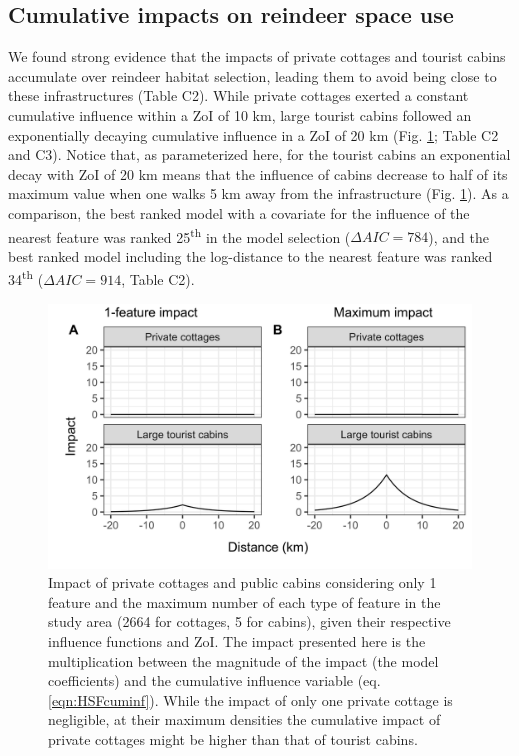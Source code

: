 \documentclass[titlepage]{article}
\begin{document}
\subsection{Cumulative impacts on reindeer space use}

We found strong evidence that the impacts of private cottages and tourist cabins accumulate over reindeer habitat selection, leading them to avoid being close to these infrastructures (Table C2). While private cottages exerted a constant cumulative influence within a ZoI of 10 km, large tourist cabins followed an exponentially decaying cumulative influence in a ZoI of 20 km (Fig. \ref{fig:impact_plot}; Table C2 and C3). Notice that, as parameterized here, for the tourist cabins an exponential decay with ZoI of 20 km means
that the influence of cabins decrease to half of its maximum value
when one walks 5 km away from the infrastructure (Fig. \ref{fig:impact_plot}). As a comparison, the best ranked model with a covariate for the influence of the nearest feature was ranked 25\textsuperscript{th} in the model selection ($\Delta AIC = 784$), and the best ranked model including the log-distance to the nearest feature was ranked 34\textsuperscript{th} ($\Delta AIC = 914$, Table C2).

\begin{figure}[h]
\centering
\includegraphics[width=1\textwidth,center]{figures/reindeer_zoi_impact_single_multiple_features.png}
\caption{\label{fig:impact_plot} Impact of private cottages and public cabins considering only 1 feature and the maximum number of each type of feature in the study area (2664 for cottages, 5 for cabins), given their respective influence functions and ZoI. The impact presented here is the multiplication between the magnitude of the impact (the model coefficients) and the cumulative influence variable (eq. \ref{eqn:HSFcuminf}). While the impact of only one private cottage is negligible, at their maximum densities the cumulative impact of private cottages might be higher than that of tourist cabins.}
\end{figure}
\end{document}
